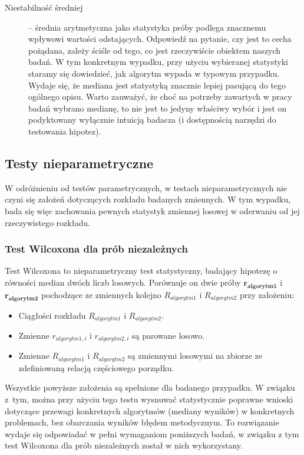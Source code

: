 \documentclass[12pt,a4paper]{report}
\begin{document}
{{{{{{\begin{description}
\item[Niestabilność średniej] -- średnia arytmetyczna jako statystyka próby podlega znacznemu wpływowi wartości odstających. Odpowiedź na pytanie, czy jest to cecha pożądana, zależy ściśle od tego, co jest rzeczywiście obiektem naszych badań. W tym konkretnym wypadku, przy użyciu wybieranej statystyki staramy się dowiedzieć, jak algorytm wypada w typowym przypadku. Wydaje się, że mediana jest statystyką znacznie lepiej pasującą do tego ogólnego opisu. Warto zauważyć, że choć na potrzeby zawartych w pracy badań wybrano medianę, to nie jest to jedyny właściwy wybór i jest on podyktowany wyłącznie intuicją badacza (i dostępnością narzędzi do testowania hipotez).
\end{description}
}
\subsection{Testy nieparametryczne}
\par{
W odróżnieniu od testów parametrycznych, w testach nieparametrycznych nie czyni się założeń dotyczących rozkładu badanych zmiennych. W tym wypadku, bada się więc zachowania pewnych statystyk zmiennej losowej w oderwaniu od jej rzeczywistego rozkładu.
}
\subsubsection{Test Wilcoxona dla prób niezależnych}
\label{Wilcoxon}
\par{
Test Wilcoxona \cite{mann1947} to nieparametryczny test statystyczny, badający hipotezę o równości median dwóch liczb losowych. Porównuje on dwie próby $\mathbf{r_{algorytm1}}$ i $\mathbf{r_{algorytm2}}$ pochodzące ze zmiennych kolejno $R_{algorytm1}$ i $R_{algorytm2}$ przy założeniu:
\begin{itemize}
\item Ciągłości rozkładu $R_{algorytm1}$ i $R_{algorytm2}$.
\item Zmienne $r_{algorytm1,i}$ i $r_{algorytm2,i}$ są parowane losowo.
\item Zmienne $R_{algorytm1}$ i $R_{algorytm2}$ są zmiennymi losowymi na zbiorze ze zdefiniowaną relacją częściowego porządku.
\end{itemize}
}
\par{
Wszystkie powyższe założenia są spełnione dla badanego przypadku. W związku z~tym, można przy użyciu tego testu wysnuwać statystycznie poprawne wnioski dotyczące przewagi konkretnych algorytmów (mediany wyników) w konkretnych problemach, bez obarczania wyników błędem metodycznym. To rozwiązanie wydaje się odpowiadać w pełni wymaganiom poniższych badań, w związku z tym test Wilcoxona dla prób niezależnych został w nich wykorzystany.
}
}}}}}
\end{document}
